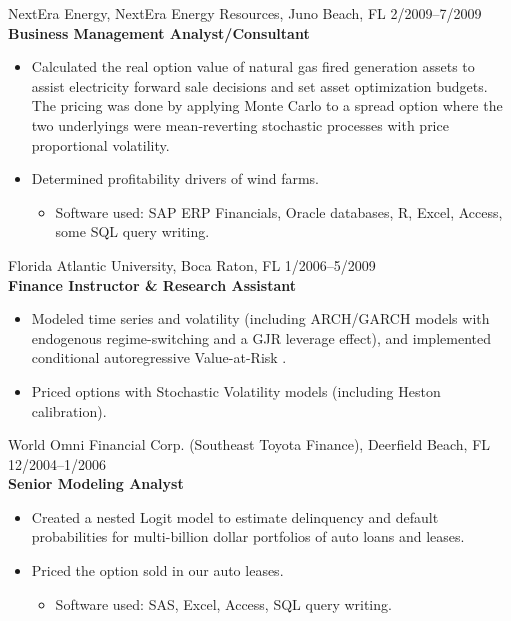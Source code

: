 \documentclass[9pt]{article}
\begin{document}
\vspace{5pt}
NextEra Energy, NextEra Energy Resources, Juno Beach, FL \hfill  \hfill 2/2009--7/2009\\
{\bf Business Management Analyst/Consultant}
\begin{itemize}[noitemsep, nolistsep]
\item Calculated the real option value of natural gas fired generation assets to assist electricity forward sale decisions and set asset optimization budgets.  The pricing was done by applying Monte Carlo to a spread option where the two underlyings were mean-reverting stochastic processes with price proportional volatility.
\item Determined profitability drivers of wind farms.
\begin{itemize}[noitemsep, nolistsep]
\item Software used: SAP ERP Financials, Oracle databases, R, Excel, Access, some SQL query writing.
\end{itemize}
\end{itemize}
\vspace{5pt}
Florida Atlantic University, Boca Raton, FL \hfill  \hfill 1/2006--5/2009\\
{\bf Finance Instructor \& Research Assistant}
\begin{itemize}[noitemsep, nolistsep]
\item Modeled time series and volatility (including ARCH/GARCH models with endogenous regime-switching and a GJR leverage effect), and implemented conditional autoregressive Value-at-Risk .
\item Priced options with Stochastic Volatility models (including Heston calibration).
\end{itemize}
\vspace{5pt}
World Omni Financial Corp. (Southeast Toyota Finance), Deerfield Beach, FL \hfill  \hfill 12/2004--1/2006\\
{\bf Senior Modeling Analyst}
\begin{itemize}[noitemsep, nolistsep]
\item Created a nested Logit model to estimate delinquency and default probabilities for multi-billion dollar portfolios of auto loans and leases.
\item Priced the option sold in our auto leases.
\begin{itemize}[noitemsep, nolistsep]
\item Software used:  SAS, Excel, Access, SQL query writing.
\end{itemize}
\end{itemize}
\vspace{10pt}
\end{document}
